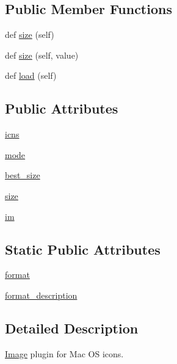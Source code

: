 \subsection*{Public Member Functions}
\begin{DoxyCompactItemize}
\item 
def \hyperlink{classPIL_1_1IcnsImagePlugin_1_1IcnsImageFile_a9d77c3cef482ce715044d23cb56d9649}{size} (self)
\item 
def \hyperlink{classPIL_1_1IcnsImagePlugin_1_1IcnsImageFile_a902997b0455989c1d6de1b29788f20c8}{size} (self, value)
\item 
def \hyperlink{classPIL_1_1IcnsImagePlugin_1_1IcnsImageFile_ab1c0f090bd473156953fb55884a9046d}{load} (self)
\end{DoxyCompactItemize}
\subsection*{Public Attributes}
\begin{DoxyCompactItemize}
\item 
\hyperlink{classPIL_1_1IcnsImagePlugin_1_1IcnsImageFile_a1c45e11af97ad785357c274f255c2775}{icns}
\item 
\hyperlink{classPIL_1_1IcnsImagePlugin_1_1IcnsImageFile_a65f3d4874bc0da85cc2e1d7109a205ad}{mode}
\item 
\hyperlink{classPIL_1_1IcnsImagePlugin_1_1IcnsImageFile_a95366f3137de39623d04dc35055d6c5b}{best\+\_\+size}
\item 
\hyperlink{classPIL_1_1IcnsImagePlugin_1_1IcnsImageFile_a5d81cdc000ce60d57360783da48be3ec}{size}
\item 
\hyperlink{classPIL_1_1IcnsImagePlugin_1_1IcnsImageFile_a7ec10f06acc13618fb5200f8462b5b98}{im}
\end{DoxyCompactItemize}
\subsection*{Static Public Attributes}
\begin{DoxyCompactItemize}
\item 
\hyperlink{classPIL_1_1IcnsImagePlugin_1_1IcnsImageFile_a924c76748b962cc4ade48c12b538326f}{format}
\item 
\hyperlink{classPIL_1_1IcnsImagePlugin_1_1IcnsImageFile_a176de956d65299728b24eb8c3dde6ccd}{format\+\_\+description}
\end{DoxyCompactItemize}


\subsection{Detailed Description}
\hyperlink{namespacePIL_1_1Image}{Image} plugin for Mac OS icons. 


